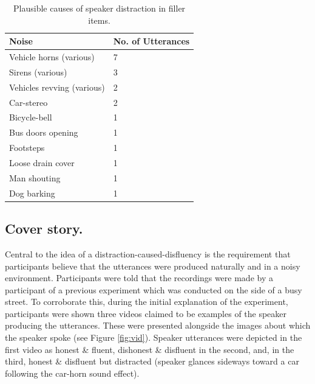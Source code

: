 \documentclass[a4paper,man,natbib]{apa6}
\begin{document}
\begin{table}
\begin{tabularx}{\linewidth}{|X|X|}
\hline
Noise & No. of Utterances\\
\hline
Vehicle horns (various) & 7 \\
Sirens (various) & 3 \\
Vehicles revving (various) & 2 \\
Car-stereo & 2 \\
Bicycle-bell & 1 \\
Bus doors opening & 1 \\
Footsteps & 1 \\
Loose drain cover & 1 \\
Man shouting & 1 \\
Dog barking & 1 \\
\hline
\end{tabularx}
\caption{Plausible causes of speaker distraction in filler items.}
\label{table:fillernoise}
\end{table}


\subsection{Cover story.}
Central to the idea of a distraction-caused-disfluency is the requirement that participants believe that the utterances were produced naturally and in a noisy environment. 
Participants were told that the recordings were made by a participant of a previous experiment which was conducted on the side of a busy street. 
To corroborate this, during the initial explanation of the experiment, participants were shown three videos claimed to be examples of the speaker producing the utterances. 
These were presented alongside the images about which the speaker spoke (see Figure \ref{fig:vid}). 
Speaker utterances were depicted in the first video as honest \& fluent, dishonest \& disfluent in the second, and, in the third, honest \& disfluent but distracted (speaker glances sideways toward a car following the car-horn sound effect).
\end{document}
